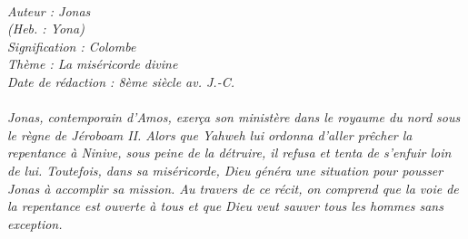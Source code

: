 \BFont
\noindent\hrulefill
{\footnotesize
\textit{
\bigskip
{\centering{}
\\Auteur : Jonas
\\(Heb. : Yona)
\\Signification : Colombe
\\Thème : La miséricorde divine
\\Date de rédaction : 8ème siècle av. J.-C.\\}
}
\textit{
\\Jonas, contemporain d’Amos, exerça son ministère dans le royaume du nord sous le règne de Jéroboam II. Alors que Yahweh lui ordonna d’aller prêcher la repentance à Ninive, sous peine de la détruire, il refusa et tenta de s'enfuir loin de lui. Toutefois, dans sa miséricorde, Dieu généra une situation pour pousser Jonas à accomplir sa mission. Au travers de ce récit, on comprend que la voie de la repentance est ouverte à tous et que Dieu veut sauver tous les hommes sans exception.\bigskip
}
}
\par\nobreak\noindent\hrulefill

